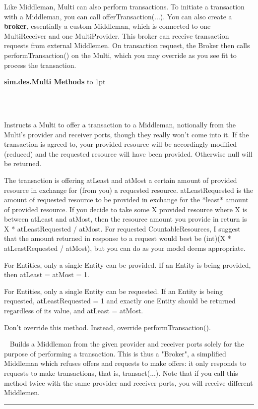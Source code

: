 \documentclass[twoside,10pt]{article}
\newcommand\class[1]{\index{Classes!{#1}}\textsf{#1}}
\newcommand\code[1]{\textsf{#1}}
\newcommand*{\xfill}[1][0pt]{%
	\cleaders
		\hbox to 1pt{\hss
			\raisebox{#1}{\rule{1.2pt}{0.4pt}}%
			\hss}\hfill}
\newenvironment{methods}[1]{
\vspace{1.0em}\noindent\textsf{\textbf{#1 Methods}}\quad \xfill[0.5ex]
\vspace{-0.25em}
\begin{description}
\small}
{\end{description}\hrule\vspace{1.5em}}
\newcommand{\mthd}[1]{\item[{\sf #1}]~\newline}
\begin{document}
Like Middleman, Multi can also perform transactions.  To initiate a transaction with a Middleman, you can call offerTransaction(...).  You can also create a {\bf broker}, essentially a custom Middleman, which is connected to one MultiReceiver and one MultiProvider.  This broker can receive transaction requests from external Middlemen.  On transaction request, the Broker then calls performTransaction() on the Multi, which you may override as you see fit to process the transaction.
 
\begin{methods}{\class{sim.des.Multi}}
\mthd{protected Resource offerTransaction(int providerPort, int receiverPort, Middleman middleman, Resource provided,}
\rule{0pt}{0pt}\hspace{\fill}{\sf double atLeast, double atMost, Resource requestedType, double atLeastRequested)}\\
Instructs a Multi to offer a transaction to a Middleman, notionally from the Multi's provider and receiver ports,
    	though they really won't come into it. If the transaction is agreed to, your provided resource will be accordingly 
    	modified (reduced) and the requested resource will have been provided.  Otherwise null will be returned.
		
The transaction is offering atLeast and atMost a certain amount of provided resource in exchange for
    	(from you) a requested resource.  atLeastRequested is the amount of requested resource to be provided
    	in exchange for the *least* amount of provided resource.  If you decide to take some X provided resource
    	where X is between atLeast and atMost, then the resource amount you provide in return is 
	\code{X * atLeastRequested / atMost}.
    	For requested CountableResources, I suggest that the amount returned in response to a request would best be
    	\code{(int)(X * atLeastRequested / atMost)}, but you can do as your model deems appropriate.
    	
For Entities, only a single Entity can be provided.  If an Entity is being provided, then atLeast = atMost = 1.
    	
For Entities, only a single Entity can be requested.  If an Entity is being requested, atLeastRequested = 1
    	and exactly one Entity should be returned regardless of its value, and atLeast = atMost. 
    	
Don't override this method.  Instead, override performTransaction().

\mthd{public Middleman getBroker(final int providerPort, final int receiverPort)}
Builds a Middleman from the given provider and receiver ports solely for the purpose of performing a transaction.
    	This is thus a "Broker", a simplified Middleman which refuses offers and requests to make offers: it only responds
    	to requests to make transactions, that is, transact(...).  Note that if you call this method twice with the
    	same provider and receiver ports, you will receive different Middlemen.
    	

\end{methods}
\end{document}
